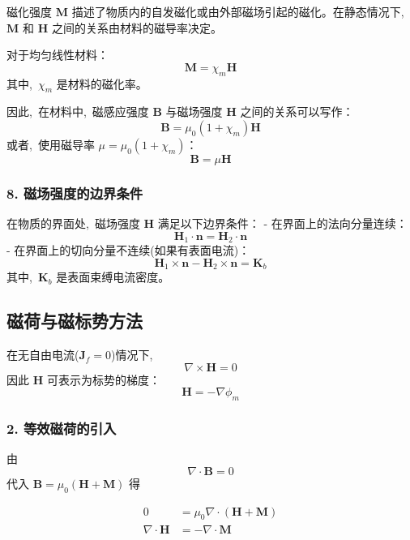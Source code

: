 磁化强度 \(\boldsymbol{M}\) 描述了物质内的自发磁化或由外部磁场引起的磁化。在静态情况下, \,\(\boldsymbol{M}\) 和 \(\boldsymbol{H}\) 之间的关系由材料的磁导率决定。

对于均匀线性材料：
\[
\boldsymbol{M} = \chi_m \boldsymbol{H}
\]
其中, \,\(\chi_m\) 是材料的磁化率。

因此, \,在材料中, \,磁感应强度 \(\boldsymbol{B}\) 与磁场强度 \(\boldsymbol{H}\) 之间的关系可以写作：
\[
\boldsymbol{B} = \mu_0 (1 + \chi_m) \boldsymbol{H}
\]
或者, \,使用磁导率 \(\mu = \mu_0 (1 + \chi_m)\)：
\[
\boldsymbol{B} = \mu \boldsymbol{H}
\]

\subsubsection*{8. 磁场强度的边界条件}

在物质的界面处, \,磁场强度 \(\boldsymbol{H}\) 满足以下边界条件：
- 在界面上的法向分量连续：
  \[
  \boldsymbol{H}_1 \cdot \boldsymbol{n} = \boldsymbol{H}_2 \cdot \boldsymbol{n}
  \]
- 在界面上的切向分量不连续(如果有表面电流)：
  \[
  \boldsymbol{H}_1 \times \boldsymbol{n} - \boldsymbol{H}_2 \times \boldsymbol{n} = \boldsymbol{K}_b
  \]
  其中, \,\(\boldsymbol{K}_b\) 是表面束缚电流密度。


\subsection{磁荷与磁标势方法}


在无自由电流($\boldsymbol J_f=0$)情况下, \,
\begin{equation}
\nabla\times \boldsymbol H = 0
\end{equation}
因此 $\boldsymbol H$ 可表示为标势的梯度：
\begin{equation}
\boldsymbol H = -\nabla \phi_m
\end{equation}


\subsubsection*{2. 等效磁荷的引入}

由
\[
\nabla\cdot \boldsymbol B = 0
\]
代入 $\boldsymbol B=\mu_0(\boldsymbol H+\boldsymbol M)$ 得

\begin{align}
0 &= \mu_0 \nabla\cdot(\boldsymbol H + \boldsymbol M) \\
\nabla\cdot \boldsymbol H &= -\nabla\cdot \boldsymbol M
\end{align}

